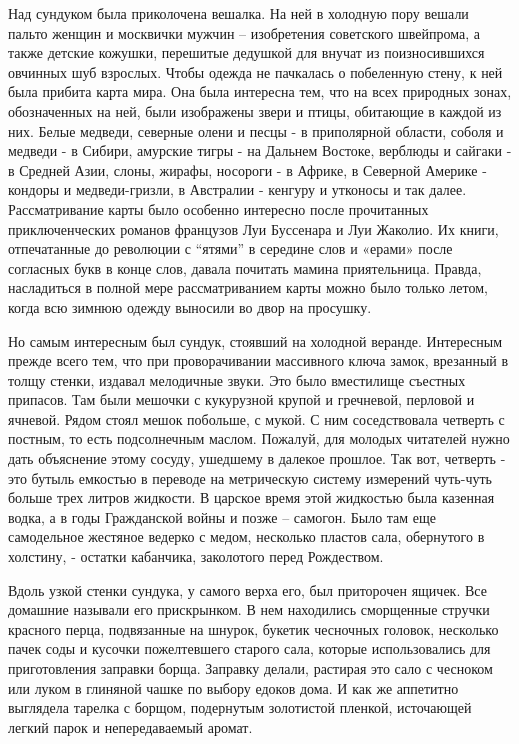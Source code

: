 Над сундуком была приколочена вешалка. На ней в холодную пору вешали пальто
женщин и москвички мужчин – изобретения советского швейпрома, а также детские
кожушки, перешитые дедушкой для внучат из поизносившихся овчинных шуб взрослых.
Чтобы одежда не пачкалась о побеленную стену, к ней была прибита карта мира.
Она была интересна тем, что на всех природных зонах, обозначенных на ней, были
изображены звери и птицы, обитающие в каждой из них. Белые медведи, северные
олени и песцы - в приполярной области, соболя и медведи - в Сибири, амурские
тигры - на Дальнем Востоке, верблюды и сайгаки - в Средней Азии, слоны, жирафы,
носороги - в Африке, в Северной Америке - кондоры и медведи-гризли, в Австралии
- кенгуру и утконосы и так далее. Рассматривание карты было особенно интересно
после прочитанных приключенческих романов французов Луи Буссенара и Луи
Жаколио. Их книги, отпечатанные до революции с \enquote{ятями} в середине слов и
«ерами» после согласных букв в конце слов, давала почитать мамина приятельница.
Правда, насладиться в полной мере рассматриванием карты можно было только
летом, когда всю зимнюю одежду выносили во двор на просушку.

Но самым интересным был сундук, стоявший на холодной веранде. Интересным прежде
всего тем, что при проворачивании массивного ключа замок, врезанный в толщу
стенки, издавал мелодичные звуки. Это было вместилище съестных припасов. Там
были мешочки с кукурузной крупой и гречневой, перловой и ячневой. Рядом стоял
мешок побольше, с мукой. С ним соседствовала четверть с постным, то есть
подсолнечным маслом. Пожалуй, для молодых читателей нужно дать объяснение этому
сосуду, ушедшему в далекое прошлое. Так вот, четверть - это бутыль емкостью в
переводе на метрическую систему измерений чуть-чуть больше трех литров
жидкости. В царское время этой жидкостью была казенная водка, а в годы
Гражданской войны и позже – самогон. Было там еще самодельное жестяное ведерко
с медом, несколько пластов сала, обернутого в холстину, - остатки кабанчика,
заколотого перед Рождеством.

Вдоль узкой стенки сундука, у самого верха его, был приторочен ящичек. Все
домашние называли его прискрынком. В нем находились сморщенные стручки красного
перца, подвязанные на шнурок, букетик чесночных головок, несколько пачек соды и
кусочки пожелтевшего старого сала, которые использовались для приготовления
заправки борща. Заправку делали, растирая это сало с чесноком или луком в
глиняной чашке по выбору едоков дома. И как же аппетитно выглядела тарелка с
борщом, подернутым золотистой пленкой, источающей легкий парок и непередаваемый
аромат.


